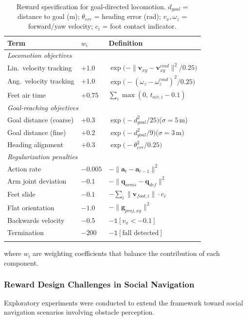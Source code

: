 \documentclass[pdflatex,sn-mathphys-num]{sn-jnl}%
\theoremstyle{thmstyleone}%
\theoremstyle{thmstyletwo}%
\theoremstyle{thmstylethree}%
\begin{document}
\begin{table}[ht]
\caption{Reward specification for goal-directed locomotion. $d_{goal}$ = distance
to goal (m); $\theta_{err}$ = heading error (rad); $v_x, \omega_z$ = forward/yaw
velocity; $c_i$ = foot contact indicator.}\label{tab:rewards}%
\begin{tabular}{@{}llp{6cm}@{}}
\toprule
Term & $w_i$ & Definition \\
\midrule
\multicolumn{3}{l}{\textit{Locomotion objectives}} \\
Lin.\ velocity tracking  & $+1.0$ & $\exp\!\bigl(-\|\mathbf{v}_{xy}-\mathbf{v}_{xy}^{cmd}\|^2/0.25\bigr)$ \\
Ang.\ velocity tracking  & $+1.0$ & $\exp\!\bigl(-(\omega_z-\omega_z^{cmd})^2/0.25\bigr)$ \\
Feet air time            & $+0.75$ & $\sum_{i}\max(0,\,t_{air,i}-0.1)$ \\
\midrule
\multicolumn{3}{l}{\textit{Goal-reaching objectives}} \\
Goal distance (coarse)   & $+0.3$ & $\exp\!\bigl(-d_{goal}^2/25\bigr)$\quad($\sigma=5$\,m) \\
Goal distance (fine)     & $+0.2$ & $\exp\!\bigl(-d_{goal}^2/9\bigr)$\quad($\sigma=3$\,m) \\
Heading alignment        & $+0.3$ & $\exp\!\bigl(-\theta_{err}^2/0.25\bigr)$ \\
\midrule
\multicolumn{3}{l}{\textit{Regularization penalties}} \\
Action rate              & $-0.005$ & $-\|\mathbf{a}_t-\mathbf{a}_{t-1}\|^2$ \\
Arm joint deviation      & $-0.1$   & $-\|\mathbf{q}_{arms}-\mathbf{q}_{def}\|^2$ \\
Feet slide               & $-0.1$   & $-\sum_{i}\|\mathbf{v}_{foot,i}\|\cdot c_i$ \\
Flat orientation         & $-1.0$   & $-\|\mathbf{g}_{proj,xy}\|^2$ \\
Backwards velocity       & $-0.5$   & $-\mathbb{1}[v_x < -0.1]$ \\
Termination              & $-200$   & $-\mathbb{1}[\text{fall detected}]$ \\
\botrule
\end{tabular}
\end{table}

where $w_i$ are weighting coefficients that balance the contribution of each component.

\subsubsection{Reward Design Challenges in Social Navigation}
Exploratory experiments were conducted to extend the framework toward social navigation scenarios involving obstacle perception.
\end{document}
